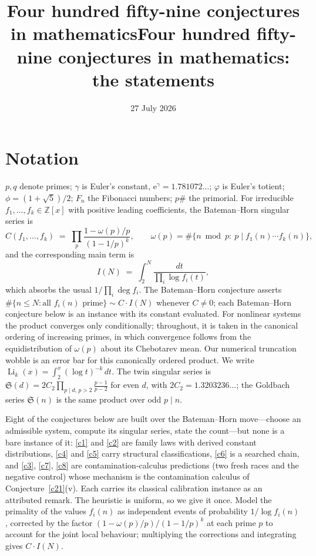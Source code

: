 \documentclass[11pt]{article}
\title{Four hundred fifty-nine conjectures in mathematics}
\author{}
\date{27 July 2026}
\theoremstyle{definition}
\newcommand{\Li}{\operatorname{Li}}
\newcommand{\e}{\mathrm{e}}
\newcommand{\SG}{\mathfrak S}
\begin{document}
\title{Four hundred fifty-nine conjectures in mathematics:\\ the statements}
\author{}\date{}
\maketitle
\section{Notation}

$p,q$ denote primes; $\gamma$ is Euler's constant,
$\e^{\gamma}=1.781072\ldots$; $\varphi$ is Euler's totient;
$\phi=(1+\sqrt5)/2$; $F_n$ the Fibonacci numbers; $p\#$ the primorial.
For irreducible $f_1,\dots,f_k\in\mathbb Z[x]$ with positive leading
coefficients, the Bateman--Horn singular series is
\[
  C(f_1,\dots,f_k)\;=\;\prod_{p}\frac{1-\omega(p)/p}{(1-1/p)^{k}},
  \qquad
  \omega(p)=\#\{n \bmod p:\ p\mid f_1(n)\cdots f_k(n)\},
\]
and the corresponding main term is
\[
  I(N)\;=\;\int_{2}^{N}\frac{dt}{\prod_{i}\log f_i(t)},
\]
which absorbs the usual $1/\prod_i \deg f_i$.  The Bateman--Horn
conjecture \cite{BH} asserts
$\#\{n\le N: \text{all } f_i(n) \text{ prime}\}\sim C\cdot I(N)$
whenever $C\neq0$; each Bateman--Horn conjecture below is an instance
with its constant evaluated.  For nonlinear systems the product
converges only conditionally; throughout, it is taken in the canonical
ordering of increasing primes, in which convergence follows from the
equidistribution of $\omega(p)$ about its Chebotarev mean.  Our
numerical truncation wobble is an error bar for this canonically
ordered product.  We write
$\Li_k(x)=\int_2^x(\log t)^{-k}\,dt$.  The twin singular series is
$\SG(d)=2C_2\prod_{p\mid d,\,p>2}\frac{p-1}{p-2}$ for even $d$, with
$2C_2=1.3203236\ldots$; the Goldbach series $\SG(n)$ is the same product
over odd $p\mid n$.

Eight of the conjectures below are built over the Bateman--Horn
move---choose an admissible system, compute its singular series,
state the count---but none is a bare instance of it:
\ref{c1} and \ref{c2} are family laws with derived constant
distributions, \ref{c4} and \ref{c5} carry structural classifications,
\ref{c6} is a searched chain, and \ref{c3}, \ref{c7}, \ref{c8} are
contamination-calculus predictions (two fresh races and the negative
control) whose mechanism is the contamination calculus of
Conjecture~\ref{c21}(v).  Each carries
its classical calibration instance as an attributed remark.
The heuristic is uniform, so we give it once.  Model the primality of the
values $f_i(n)$ as independent events
of probability $1/\log f_i(n)$, corrected by the factor
$(1-\omega(p)/p)/(1-1/p)^k$ at each prime $p$ to account for the joint
local behaviour; multiplying the corrections and integrating gives
$C\cdot I(N)$.
\end{document}
